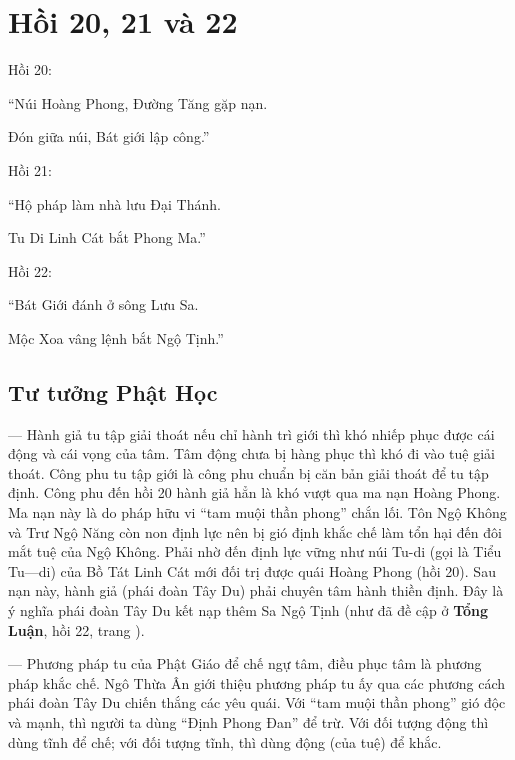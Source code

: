 \chapter{Hồi 20, 21 và 22} %
\label{cha:hoi_20_21_22}

Hồi 20:

\begin{itshape}
``Núi Hoàng Phong, Đường Tăng gặp nạn.

Đón giữa núi, Bát giới lập công.''
\end{itshape}

Hồi 21:

\begin{itshape}
``Hộ pháp làm nhà lưu Đại Thánh.

Tu Di Linh Cát bắt Phong Ma.''
\end{itshape}

Hồi 22:

\begin{itshape}
``Bát Giới đánh ở sông Lưu Sa.

Mộc Xoa vâng lệnh bắt Ngộ Tịnh.''
\end{itshape}

\section{Tư tưởng Phật Học} %
\label{sec:20_21_22_phat_hoc}

--- Hành giả tu tập giải thoát nếu chỉ hành trì giới thì khó nhiếp phục được cái động và cái vọng của tâm. Tâm động chưa bị hàng phục thì khó đi vào tuệ giải thoát. Công phu tu tập giới là công phu chuẩn bị căn bản giải thoát để tu tập định. Công phu đến hồi 20 hành giả hẳn là khó vượt qua ma nạn Hoàng Phong. Ma nạn này là do pháp hữu vi ``tam muội thần phong'' chắn lối. Tôn Ngộ Không và Trư Ngộ Năng còn non định lực nên bị gió định khắc chế làm tổn hại đến đôi mắt tuệ của Ngộ Không. Phải nhờ đến định lực vững như núi Tu-di (gọi là Tiểu Tu---di) của Bồ Tát Linh Cát mới đối trị được quái Hoàng Phong (hồi 20). Sau nạn này, hành giả (phái đoàn Tây Du) phải chuyên tâm hành thiền định. Đây là ý nghĩa phái đoàn Tây Du kết nạp thêm Sa Ngộ Tịnh (như đã đề cập ở {\bf Tổng Luận}, hồi 22, trang \pageref{sub:ve_sa_ngo_tinh}).

--- Phương pháp tu của Phật Giáo để chế ngự tâm, điều phục tâm là phương pháp khắc chế. Ngô Thừa Ân giới thiệu phương pháp tu ấy qua các phương cách phái đoàn Tây Du chiến thắng các yêu quái. Với ``tam muội thần phong'' gió độc và mạnh, thì người ta dùng ``Định Phong Đan'' để trừ. Với đối tượng động thì dùng tĩnh để chế; với đối tượng tĩnh, thì dùng động (của tuệ) để khắc.

